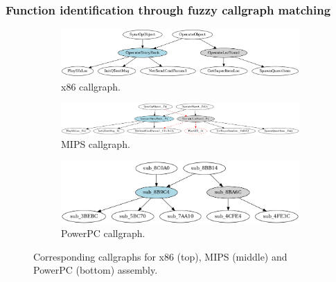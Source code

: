 \begin{frame}
	\frametitle{Function identification through fuzzy callgraph matching}

	\begin{figure}[htbp]
		\begin{subfigure}{1\textwidth}
			\centering
			\includegraphics[width=0.65\linewidth]{inc/example/callgraph_x86.png}
			\caption{x86 callgraph.}
		\end{subfigure}
		\begin{subfigure}{1\textwidth}
			\centering
			\vspace*{1em}
			\includegraphics[width=0.9\linewidth]{inc/example/callgraph_mips.png}
			\caption{MIPS callgraph.}
		\end{subfigure}
		\begin{subfigure}{1\textwidth}
			\centering
			\vspace*{1em}
			\includegraphics[width=0.5\linewidth]{inc/example/callgraph_ppc_before.png}
			\caption{PowerPC callgraph.}
		\end{subfigure}
		\caption{Corresponding callgraphs for x86 (top), MIPS (middle) and PowerPC (bottom) assembly.}
	\end{figure}

\end{frame}


